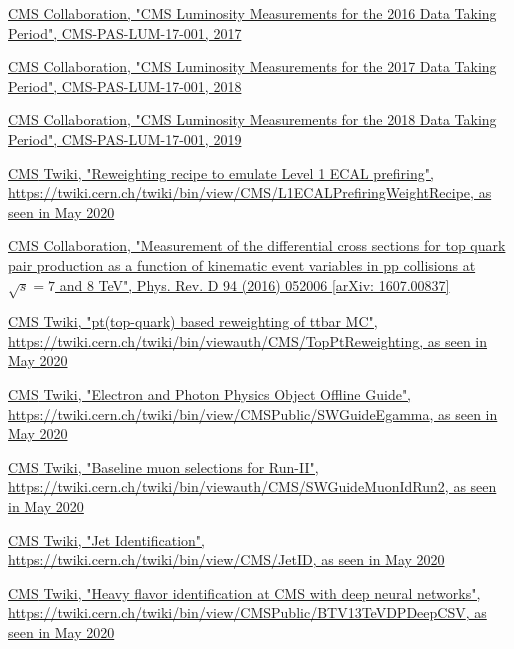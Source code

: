 \documentclass[a4paper, 10pt, openright]{report}
\begin{document}
\begin{thebibliography}{1}
\href{https://cds.cern.ch/record/2257069}{CMS Collaboration,
"CMS Luminosity Measurements for the 2016 Data Taking Period",
CMS-PAS-LUM-17-001, 2017}

\href{http://inspirehep.net/record/1677076}{CMS Collaboration,
"CMS Luminosity Measurements for the 2017 Data Taking Period",
CMS-PAS-LUM-17-001, 2018}

\href{http://inspirehep.net/record/1736713/}{CMS Collaboration,
"CMS Luminosity Measurements for the 2018 Data Taking Period",
CMS-PAS-LUM-17-001, 2019}

\href{https://twiki.cern.ch/twiki/bin/view/CMS/L1ECALPrefiringWeightRecipe}{\ac{CMS} Twiki,
"Reweighting recipe to emulate Level 1 ECAL prefiring", \url{https://twiki.cern.ch/twiki/bin/view/CMS/L1ECALPrefiringWeightRecipe}, as seen in May 2020}

\href{https://arxiv.org/abs/1607.00837}{CMS Collaboration,
"Measurement of the differential cross sections for top quark pair production as a function of kinematic event variables in pp collisions at $\sqrt{s} = 7$ and 8 TeV",
Phys. Rev. D 94 (2016) 052006 [arXiv: 1607.00837]}

\href{https://twiki.cern.ch/twiki/bin/viewauth/CMS/TopPtReweighting}{\ac{CMS} Twiki,
"pt(top-quark) based reweighting of ttbar MC", \url{https://twiki.cern.ch/twiki/bin/viewauth/CMS/TopPtReweighting}, as seen in May 2020}

\href{https://twiki.cern.ch/twiki/bin/view/CMSPublic/SWGuideEgamma}{\ac{CMS} Twiki,
"Electron and Photon Physics Object Offline Guide", \url{https://twiki.cern.ch/twiki/bin/view/CMSPublic/SWGuideEgamma}, as seen in May 2020}

\href{https://twiki.cern.ch/twiki/bin/viewauth/CMS/SWGuideMuonIdRun2}{\ac{CMS} Twiki,
"Baseline muon selections for Run-II", \url{https://twiki.cern.ch/twiki/bin/viewauth/CMS/SWGuideMuonIdRun2}, as seen in May 2020}

\href{https://twiki.cern.ch/twiki/bin/view/CMS/JetID}{\ac{CMS} Twiki,
"Jet Identification", \url{https://twiki.cern.ch/twiki/bin/view/CMS/JetID}, as seen in May 2020}

\href{https://twiki.cern.ch/twiki/bin/view/CMSPublic/BTV13TeVDPDeepCSV}{\ac{CMS} Twiki,
"Heavy flavor identification at CMS with deep neural networks", \url{https://twiki.cern.ch/twiki/bin/view/CMSPublic/BTV13TeVDPDeepCSV}, as seen in May 2020}


\end{thebibliography}
\end{document}
